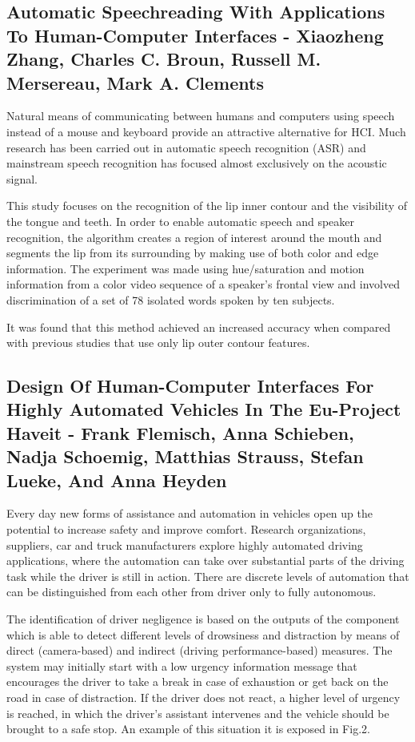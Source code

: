 \documentclass[12pt, twoside]{article}
\begin{document}
\subsection{Automatic Speechreading With Applications To Human-Computer Interfaces - Xiaozheng Zhang, Charles C. Broun, Russell M. Mersereau, Mark A. Clements\cite{4}}
Natural means of communicating between humans and computers using speech instead of a mouse and keyboard provide an attractive alternative for HCI. Much research has been carried out in automatic speech recognition (ASR) and mainstream speech recognition has focused almost exclusively on the acoustic signal.

This study focuses on the recognition of the lip inner contour and the visibility of the tongue and teeth. In order to enable automatic speech and speaker recognition, the algorithm creates a region of interest around the mouth and segments the lip from its surrounding by making use of both color and edge information. The experiment was made using hue/saturation and motion information from a color video sequence of a speaker’s frontal view and involved discrimination of a set of 78 isolated words spoken by ten subjects.

It was found that this method achieved an increased accuracy when compared with previous studies that use only lip outer contour features.

\subsection{Design Of Human-Computer Interfaces For Highly Automated Vehicles In The Eu-Project Haveit - Frank Flemisch, Anna Schieben, Nadja Schoemig, Matthias Strauss, Stefan Lueke, And Anna Heyden\cite{5}}
Every day new forms of assistance and automation in vehicles open up the potential to increase safety and improve comfort. Research organizations, suppliers, car and truck manufacturers explore highly automated driving applications, where the automation can take over substantial parts of the driving task while the driver is still in action. There are discrete levels of automation that can be distinguished from each other from driver only to fully autonomous.

The identification of driver negligence is based on the outputs of the component which is able to detect different levels of drowsiness and distraction by means of direct (camera-based) and indirect (driving performance-based) measures. The system may initially start with a low urgency information message that encourages the driver to take a break in case of exhaustion or get back on the road in case of distraction. If the driver does not react, a higher level of urgency is reached, in which the driver's assistant intervenes and the vehicle should be brought to a safe stop. An example of this situation it is exposed in Fig.2.
\end{document}

